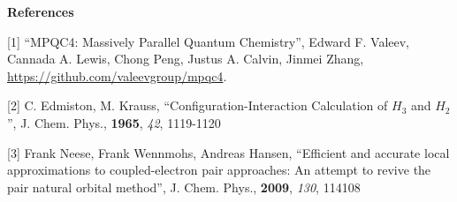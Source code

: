 \documentclass[12pt]{article}
\begin{document}
\vspace{12pt}

\vspace{12pt}

\parindent=0pt
{\bf References}

[1] ``MPQC4: Massively Parallel Quantum Chemistry'', Edward F. Valeev, Cannada 
A. Lewis, Chong Peng, Justus A. Calvin, Jinmei Zhang,
\url{https://github.com/valeevgroup/mpqc4}.

[2] C. Edmiston, M. Krauss, ``Configuration-Interaction Calculation of $H_3$ and $H_2$'',
J. Chem. Phys., {\bf 1965}, {\em 42}, 1119-1120

[3] Frank Neese, Frank Wennmohs, Andreas Hansen, ``Efficient and accurate local approximations
to coupled-electron pair approaches: An attempt to revive the pair natural orbital
method'', J. Chem. Phys., {\bf 2009}, {\em 130}, 114108
\end{document}
